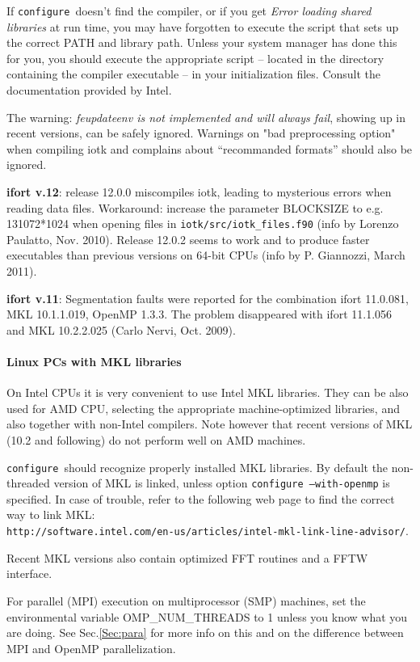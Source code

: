 \documentclass[12pt,a4paper]{article}
\def\configure{\texttt{configure}}
\begin{document}
If \configure\ doesn't find the compiler, or if you get 
{\em Error loading shared libraries} at run time, you may have 
forgotten to execute the script that
sets up the correct PATH and library path. Unless your system manager has
done this for you, you should execute the appropriate script -- located in
the directory containing the compiler executable -- in your
initialization files. Consult the documentation provided by Intel. 
    
The warning: {\em feupdateenv is not implemented and will always fail}, 
showing up in recent versions, can be safely ignored. Warnings on
"bad preprocessing option" when compiling iotk
and complains about ``recommanded formats''
should also be ignored.

{\bf ifort v.12}: release 12.0.0 miscompiles iotk, leading to 
mysterious errors when reading data files. Workaround: increase 
the parameter BLOCKSIZE to e.g. 131072*1024 when opening files in 
\texttt{iotk/src/iotk\_files.f90} (info by Lorenzo Paulatto,
Nov. 2010). Release 12.0.2 seems to work and to produce faster executables
than previous versions on 64-bit CPUs (info by P. Giannozzi, March 2011).

{\bf ifort v.11}: Segmentation faults were reported for the combination 
ifort 11.0.081, MKL 10.1.1.019, OpenMP 1.3.3. The problem disappeared
with ifort 11.1.056 and MKL 10.2.2.025 (Carlo Nervi, Oct. 2009).

\paragraph{Linux PCs with MKL libraries}
On Intel CPUs it is very convenient to use Intel MKL libraries.
They can be also used for AMD CPU, selecting the appropriate machine-optimized
libraries, and also together with non-Intel compilers. Note however
that recent versions of MKL (10.2 and following) do not perform
well on AMD machines.

\configure\ should recognize properly installed MKL libraries.
By default the non-threaded version of MKL is linked, unless option
\texttt{configure --with-openmp} is specified. In case of trouble,
refer to the following web page to find the correct way to link MKL:\\
\texttt{http://software.intel.com/en-us/articles/intel-mkl-link-line-advisor/}.

Recent MKL versions also contain optimized FFT routines and a FFTW interface.

For parallel (MPI) execution on multiprocessor (SMP) machines, set the
environmental variable OMP\_NUM\_THREADS to 1 unless you know what you 
are doing. See Sec.\ref{Sec:para} for more info on this
and on the difference between MPI and OpenMP parallelization. 
\end{document}
